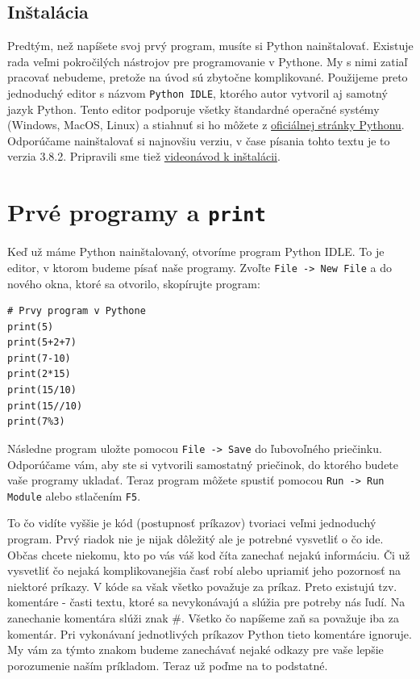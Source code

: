 \subsection{Inštalácia}
Predtým, než napíšete svoj prvý program, musíte si Python nainštalovať. Existuje rada veľmi pokročilých nástrojov pre programovanie v Pythone. My s nimi zatiaľ pracovať nebudeme, pretože na úvod sú zbytočne komplikované.
Použijeme preto jednoduchý editor s názvom \texttt{Python IDLE}, ktorého autor vytvoril aj samotný jazyk Python. Tento editor podporuje všetky štandardné operačné systémy (Windows, MacOS, Linux) a stiahnuť si ho môžete z \href{https://www.python.org/downloads/}{oficiálnej stránky Pythonu}. Odporúčame nainštalovať si najnovšiu verziu, v čase písania tohto textu je to verzia 3.8.2. Pripravili sme tiež \href{https://www.youtube.com/watch?v=_oLcUfkgxSI}{videonávod k inštalácii}.

\section{Prvé programy a \texttt{print}}
Keď už máme Python nainštalovaný, otvoríme program Python IDLE. To je editor, v ktorom budeme písať naše programy. Zvoľte \texttt{File -> New File} a do nového okna, ktoré sa otvorilo, skopírujte program:
\begin{lstlisting}
# Prvy program v Pythone
print(5)
print(5+2+7)
print(7-10)
print(2*15)
print(15/10)
print(15//10)
print(7%3)
\end{lstlisting}
Následne program uložte pomocou \texttt{File -> Save} do ľubovoľného priečinku. Odporúčame vám, aby ste si vytvorili samostatný priečinok, do ktorého budete vaše programy ukladať. Teraz program môžete spustiť pomocou \texttt{Run -> Run Module} alebo stlačením \texttt{F5}. 

To čo vidíte vyššie je kód (postupnosť príkazov) tvoriaci veľmi jednoduchý program. Prvý riadok nie je nijak dôležitý ale je potrebné vysvetliť o čo ide. Občas chcete niekomu, kto po vás váš kod číta zanechať nejakú informáciu. Či už vysvetliť čo nejaká komplikovanejšia časť robí alebo upriamiť jeho pozornosť na niektoré príkazy. V kóde sa však všetko považuje za príkaz. Preto existujú tzv. komentáre - časti textu, ktoré sa nevykonávajú a slúžia pre potreby nás ľudí. Na zanechanie komentára slúži znak $\#$. Všetko čo napíšeme zaň sa považuje iba za komentár. Pri vykonávaní jednotlivých príkazov Python tieto komentáre ignoruje. My vám za týmto znakom budeme zanechávať nejaké odkazy pre vaše lepšie porozumenie naším príkladom. Teraz už poďme na to podstatné.

